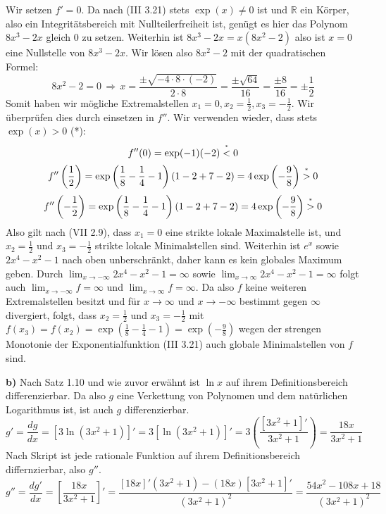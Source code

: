 \documentclass[a4paper,graphics,11pt]{article}
\newcommand{\up}[2]{\mathrel{\overset{\makebox[0pt]{\mbox{\normalfont\tiny #2}}}{#1}}}
\begin{document}
Wir setzen $f'=0$. Da nach (III 3.21) stets $\exp(x) \neq 0$ ist und $\mathbb{R}$ ein Körper,
also ein Integritätsbereich mit Nullteilerfreiheit ist, genügt es hier das Polynom
$8x^3-2x$ gleich 0 zu setzen. Weiterhin ist $8x^3-2x = x(8x^2-2)$ also ist $x=0$ eine
Nullstelle von $8x^3-2x$. Wir lösen also $8x^2-2$ mit der quadratischen Formel:
$$
    8x^2-2 = 0
    \,\Longrightarrow\, x = \frac{\pm\sqrt{-4\cdot8\cdot(-2)}}{2\cdot 8}
    = \frac{\pm \sqrt{64}}{16} = \frac{\pm8}{16} = \pm \frac{1}{2}
$$
Somit haben wir mögliche Extremalstellen $x_1 = 0, x_2 = \frac{1}{2}, x_3 = - \frac{1}{2}$.
Wir überprüfen dies durch einsetzen in $f''$. Wir verwenden wieder, dass stets $\exp(x) > 0$ (*):
$$
    f''(0) = \exp(-1)(-2) \up{<}{*} 0
$$$$
    f''\left(\frac{1}{2}\right)
    = \exp\left(\frac{1}{8}- \frac{1}{4} -1\right)\left(1- 2 + 7 - 2\right)
    = 4\exp\left(-\frac{9}{8}\right) \up{>}{*} 0
$$$$
     f''\left(-\frac{1}{2}\right)
    = \exp\left(\frac{1}{8}- \frac{1}{4} -1\right)\left(1- 2 + 7 - 2\right)
    = 4\exp\left(-\frac{9}{8}\right) \up{>}{*} 0
$$
Also gilt nach (VII 2.9), dass $x_1 = 0$ eine strikte lokale Maximalstelle ist,
und $x_2=\frac{1}{2}$ und $x_3 = - \frac{1}{2}$ strikte lokale Minimalstellen sind.
Weiterhin ist $e^x$ sowie $2x^4-x^2-1$ nach oben unberschränkt, daher kann es kein
globales Maximum geben. Durch $\lim_{x \to -\infty}\limits 2x^4-x^2-1 = \infty$ sowie
$\lim_{x \to \infty}\limits 2x^4-x^2-1 = \infty$ folgt auch $\lim_{x \to -\infty}\limits
f = \infty$ und $\lim_{x \to \infty}\limits f = \infty$. Da also $f$ keine weiteren
Extremalstellen besitzt und für $x\to \infty$ und $x\to -\infty$ bestimmt gegen $\infty$ 
divergiert, folgt, dass $x_2 = \frac{1}{2}$ und $x_3 = -\frac{1}{2}$
mit $f(x_3) = f(x_2) = \exp\left(\frac{1}{8}-\frac{1}{4} -1\right)
= \exp\left(-\frac{9}{8}\right)$ wegen der strengen Monotonie der Exponentialfunktion
(III 3.21) auch globale Minimalstellen von $f$ sind.

\newpage

\textbf{b)}
Nach Satz 1.10 und wie zuvor erwähnt ist $\ln x$ auf ihrem Definitionsbereich differenzierbar. Da also $g$ eine
Verkettung von Polynomen und dem natürlichen Logarithmus ist, ist auch $g$ differenzierbar.
$$
    g' = \frac{dg}{dx} = [3\ln(3x^2+1)]'
    = 3[\ln(3x^2+1)]'
    = 3\left(\frac{[3x^2+1]'}{3x^2+1}\right)
    = \frac{18x}{3x^2+1}
$$
Nach Skript ist jede rationale Funktion auf ihrem Definitionsbereich differnzierbar, also $g''$.
$$
    g'' = \frac{dg'}{dx} = \left[\frac{18x}{3x^2+1}\right]'
    = \frac{[18x]'(3x^2+1)-(18x)[3x^2+1]'}{(3x^2+1)^2}
    = \frac{54x^2-108x+18}{(3x^2+1)^2}
$$
\end{document}
